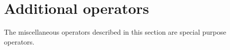 \section{Additional operators}

The miscellaneous operators described in this section are special
purpose operators.